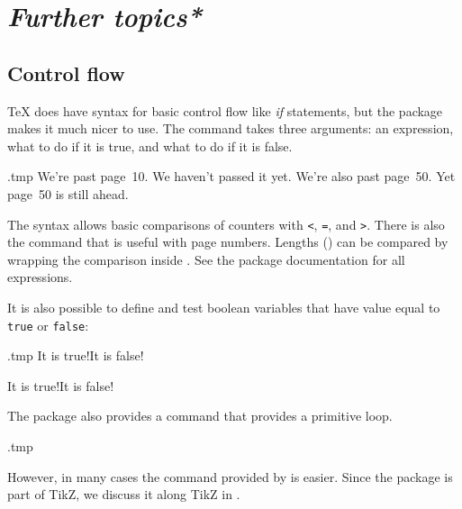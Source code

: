 %
%
%
\section{\emph{Further topics*}}

%
%
\subsection{Control flow}\label{sec:if}

\TeX{} does have syntax for basic control flow like \emph{if} statements,
but the  package makes it much nicer to use.
The  command takes three arguments:
an expression, what to do if it is true, and what to do if it is false.
%
\begin{VerbatimOut}{\jobname.tmp}
    {We're past page~10.}
    {We haven't passed it yet.}
    {We're also past page~50.}
    {Yet page~50 is still ahead.}
\end{VerbatimOut}
\ShowExample
%
The syntax allows basic comparisons of counters with
\verb|<|, \verb|=|, and \verb|>|.
There is also the  command that is useful with page numbers.
Lengths () can be compared by wrapping the comparison inside .
See the package documentation for all expressions.

It is also possible to define and test boolean variables
that have value equal to \verb|true| or \verb|false|:\label{ex:booleans}
%
\begin{VerbatimOut}{\jobname.tmp}
    {It is true!}{It is false!}

    {It is true!}{It is false!}
\end{VerbatimOut}
\ShowExample

The package also provides a  command that provides a primitive loop.
%
\begin{VerbatimOut}{\jobname.tmp}

\end{VerbatimOut}
\ShowExample

However, in many cases the  command provided by  is easier.
Since the  package is part of TikZ,
we discuss it along TikZ in .


